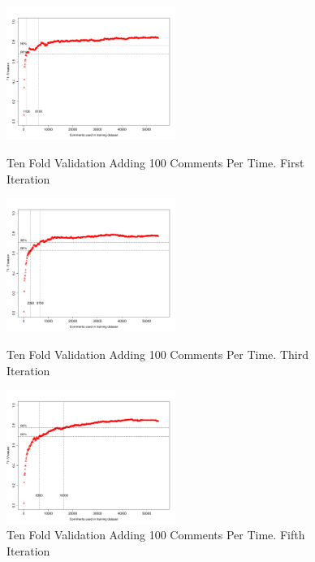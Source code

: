 \clearpage
\begin{figure}[thb!]
  \centering
  \vspace{-3mm}
  \includegraphics[width=0.49\textwidth]{figures/appendix/ten_fold_validation_design/ten_fold_validation_0_100.pdf}
  \vspace{-5mm}
  \caption{Ten Fold Validation Adding 100 Comments Per Time. First Iteration}
  \label{fig:design_ten_fold_validation_0_100}
  \includegraphics[width=0.49\textwidth]{figures/appendix/ten_fold_validation_design/ten_fold_validation_2_100.pdf}
  \vspace{-5mm}
  \caption{Ten Fold Validation Adding 100 Comments Per Time. Third Iteration}
  \label{fig:design_ten_fold_validation_2_100}
  \includegraphics[width=0.49\textwidth]{figures/appendix/ten_fold_validation_design/ten_fold_validation_4_100.pdf}
  \vspace{-5mm}
  \caption{Ten Fold Validation Adding 100 Comments Per Time. Fifth Iteration}
  \label{fig:design_ten_fold_validation_4_100}
\end{figure}

